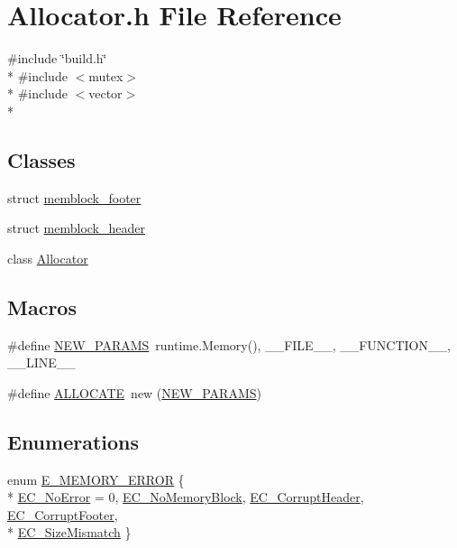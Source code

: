 \section{Allocator.\-h File Reference}
\label{_allocator_8h}
{\ttfamily \#include \char`\"{}build.\-h\char`\"{}}\\*
{\ttfamily \#include $<$mutex$>$}\\*
{\ttfamily \#include $<$vector$>$}\\*
\subsection*{Classes}
\begin{DoxyCompactItemize}
\item 
struct \hyperlink{structmemblock__footer}{memblock\-\_\-footer}
\item 
struct \hyperlink{structmemblock__header}{memblock\-\_\-header}
\item 
class \hyperlink{class_allocator}{Allocator}
\end{DoxyCompactItemize}
\subsection*{Macros}
\begin{DoxyCompactItemize}
\item 
\#define \hyperlink{_allocator_8h_a82147ceee173078e75736cfcdf727dbe}{N\-E\-W\-\_\-\-P\-A\-R\-A\-M\-S}~runtime.\-Memory(), \-\_\-\-\_\-\-F\-I\-L\-E\-\_\-\-\_\-, \-\_\-\-\_\-\-F\-U\-N\-C\-T\-I\-O\-N\-\_\-\-\_\-, \-\_\-\-\_\-\-L\-I\-N\-E\-\_\-\-\_\-
\item 
\#define \hyperlink{_allocator_8h_aaee4c38c9ed86ede98d1d4c05f14b0c5}{A\-L\-L\-O\-C\-A\-T\-E}~new (\hyperlink{_allocator_8h_a82147ceee173078e75736cfcdf727dbe}{N\-E\-W\-\_\-\-P\-A\-R\-A\-M\-S})
\end{DoxyCompactItemize}
\subsection*{Enumerations}
\begin{DoxyCompactItemize}
\item 
enum \hyperlink{_allocator_8h_adc7040deea27628dba424c534b71dbbf}{E\-\_\-\-M\-E\-M\-O\-R\-Y\-\_\-\-E\-R\-R\-O\-R} \{ \\*
\hyperlink{_allocator_8h_adc7040deea27628dba424c534b71dbbfa0bb40faa20ee2383cd4071a19e6756ee}{E\-C\-\_\-\-No\-Error} =  0, 
\hyperlink{_allocator_8h_adc7040deea27628dba424c534b71dbbfaaacd8ad060ec70bc74896b8f3375bfff}{E\-C\-\_\-\-No\-Memory\-Block}, 
\hyperlink{_allocator_8h_adc7040deea27628dba424c534b71dbbfabb546aef3131ea5f3da84fd374da1f45}{E\-C\-\_\-\-Corrupt\-Header}, 
\hyperlink{_allocator_8h_adc7040deea27628dba424c534b71dbbfac73a2ab817ee9057c110c277e1580317}{E\-C\-\_\-\-Corrupt\-Footer}, 
\\*
\hyperlink{_allocator_8h_adc7040deea27628dba424c534b71dbbfad493ed6f6910767ac848c9ebcc55c518}{E\-C\-\_\-\-Size\-Mismatch}
 \}
\end{DoxyCompactItemize}

